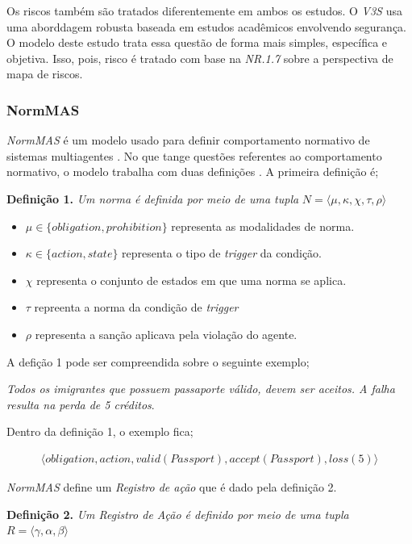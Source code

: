 \documentclass[12pt]{article}
\begin{document}
Os riscos também são tratados diferentemente em ambos os estudos. O \textit{V3S} usa uma aborddagem robusta baseada em estudos acadêmicos envolvendo segurança. O modelo deste estudo trata essa questão de forma mais simples, específica e objetiva. Isso, pois, risco é tratado com base na \textit{NR.1.7} sobre a perspectiva de mapa de riscos. 

\subsubsection{NormMAS}

\textit{NormMAS} é um modelo usado para definir comportamento normativo de sistemas multiagentes \cite{chang}. No que tange questões referentes ao comportamento normativo, o modelo trabalha com duas definições \cite{chang}. A primeira definição é;

\textbf{Definição 1.} \textit{Um norma é definida por meio de uma tupla} $N = \langle \mu,\kappa,\chi,\tau,\rho \rangle$

\begin{itemize}
    \item $\mu \in \{obligation,prohibition\}$ representa as modalidades de norma.
    \item $\kappa \in \{action,state\}$ representa o tipo de \textit{trigger} da condição.
    \item $\chi$ representa o conjunto de estados em que uma norma se aplica.
    \item $\tau$ repreenta a norma da condição de \textit{trigger}
    \item $\rho$ representa a sanção aplicava pela violação do agente.
\end{itemize}

A defição 1 pode ser compreendida sobre o seguinte exemplo; 

\textit{Todos os imigrantes que possuem passaporte válido, devem ser aceitos. A falha resulta na perda de 5 créditos}. 

Dentro da definição 1, o exemplo fica;

\begin{eqnarray}
    \langle obligation,action,valid(Passport),accept(Passport),loss(5)\rangle
\end{eqnarray}

\textit{NormMAS} define um \textit{Registro de ação} que é dado pela definição 2. 

\textbf{Definição 2.} \textit{Um Registro de Ação é definido por meio de uma tupla} $R = \langle \gamma,\alpha,\beta \rangle$
\end{document}
